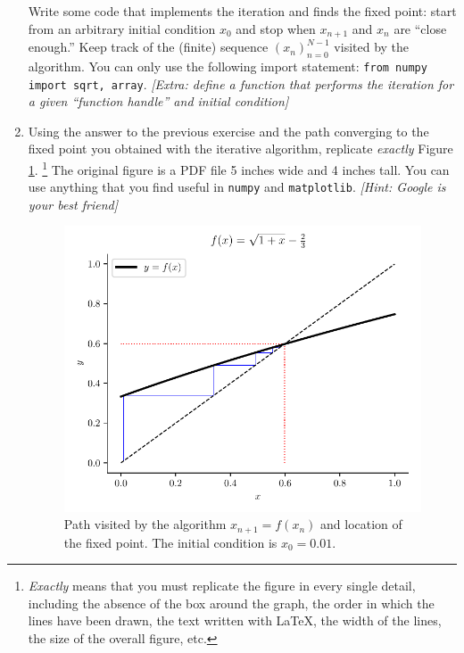 \documentclass[a4paper,11pt]{article}
\begin{document}
\begin{enumerate}
			Write some code that implements the iteration and finds the fixed point: start from an arbitrary initial condition $x_0$ and stop when $x_{n+1}$ and $x_n$ are ``close enough.''
			Keep track of the (finite) sequence ${(x_n)}_{n=0}^{N-1}$ visited by the algorithm.
			You can only use the following import statement: \texttt{from numpy import sqrt, array}. 
			\emph{[Extra: define a function that performs the iteration for a given ``function handle'' and initial condition]}

		\item 
			Using the answer to the previous exercise and the path converging to the fixed point you obtained with the iterative algorithm, replicate \emph{exactly} Figure \ref{fig:fixed_point}.%
				\footnote{
					\emph{Exactly} means that you must replicate the figure in every single detail, including the absence of the box around the graph, the order in which the lines have been drawn, the text written with \LaTeX, the width of the lines, the size of the overall figure, etc.
				}
			The original figure is a PDF file 5 inches wide and 4 inches tall.
			You can use anything that you find useful in \texttt{numpy} and \texttt{matplotlib}.
			\emph{[Hint: Google is your best friend]}
			\begin{figure}
				\centering
				\includegraphics{./fixed_point.pdf}
				\caption{Path visited by the algorithm $x_{n+1} = f(x_n)$ and location of the fixed point.
				The initial condition is $x_0 = 0.01$.}
				\label{fig:fixed_point}
			\end{figure}
	\end{enumerate}
\end{document}
